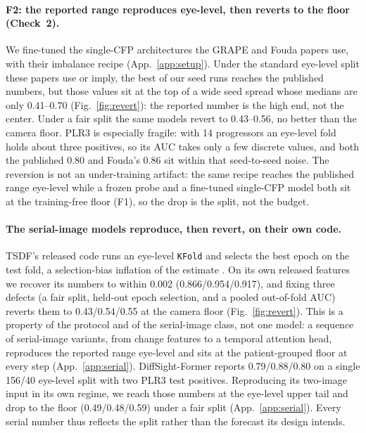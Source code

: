 \paragraph{F2: the reported range reproduces eye-level, then reverts to the floor (Check~2).} We fine-tuned the
single-CFP architectures the GRAPE and Fouda papers use, with their imbalance recipe (App.~\ref{app:setup}). Under the
standard eye-level split these papers use or imply, the best of our seed runs reaches the published numbers, but those
values sit at the top of a wide seed spread whose medians are
only \num{0.41}--\num{0.70} (Fig.~\ref{fig:revert}): the reported number is the high end, not the center. Under a fair
split the same models revert to \num{0.43}--\num{0.56}, no better than the camera floor. PLR3 is especially fragile: with
14 progressors an eye-level fold holds about three positives, so its AUC takes only a few discrete values, and both the
published \num{0.80} and Fouda's \num{0.86} sit within that seed-to-seed noise. The reversion is not an under-training
artifact: the same recipe reaches the published range eye-level while a frozen probe and a fine-tuned single-CFP model both sit
at the training-free floor (F1), so the drop is the split, not the budget.

\paragraph{The serial-image models reproduce, then revert, on their own code.} TSDF's released code
\citep{song2025tsdf} runs an eye-level \texttt{KFold} and selects the
best epoch on the test fold, a selection-bias inflation of the estimate \citep{cawley2010overfitting}. On its own
released features we recover its numbers to within \num{0.002}
(\num{0.866}/\num{0.954}/\num{0.917}), and fixing three defects (a fair split, held-out epoch selection, and a pooled
out-of-fold AUC) reverts them to \num{0.43}/\num{0.54}/\num{0.55} at the camera floor (Fig.~\ref{fig:revert}). This is a
property of the protocol and of the serial-image class, not one model: a sequence of serial-image variants, from change
features to a temporal attention head, reproduces the reported range eye-level and sits at the patient-grouped floor at
every step (App.~\ref{app:serial}). DiffSight-Former \citep{huang2026diffsight} reports \num{0.79}/\num{0.88}/\num{0.80} on a single
\num{156}/\num{40} eye-level split with two PLR3 test positives. Reproducing its two-image input in its own regime, we
reach those numbers at the eye-level upper tail and drop to the floor (\num{0.49}/\num{0.48}/\num{0.59}) under a fair
split (App.~\ref{app:serial}). Every serial number thus reflects the split rather than the forecast its design intends.

